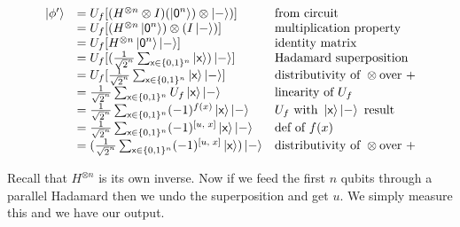 \[ 
\begin{array}{lll}
 \left|\phi'\right\rangle &= U_f [(H^{\otimes n} \otimes I)(\left|\textsf{0}^n\right\rangle) \otimes \left|-\right\rangle)]  & \text{from circuit} \\
  &= U_f [(H^{\otimes n}\left|\textsf{0}^n\right\rangle) \otimes (I\left|-\right\rangle)]  & \text{multiplication property} \\
  &= U_f [H^{\otimes n}\left|\textsf{0}^n\right\rangle\left|-\right\rangle]  & \text{identity matrix} \\
  &= U_f [(\frac{1}{\sqrt{2}^n} \sum_{\textsf{x} \in \{0,1\}^n} \left|\textsf{x}\right\rangle) \left|-\right\rangle] & \text{Hadamard superposition} \\
  &= U_f [\frac{1}{\sqrt{2}^n} \sum_{\textsf{x} \in \{0,1\}^n} \left|\textsf{x}\right\rangle \left|-\right\rangle]  
  & \text{distributivity of } \otimes  \text{over } + \\  
  &= \frac{1}{\sqrt{2}^n} \sum_{\textsf{x} \in \{0,1\}^n} U_f \left|\textsf{x}\right\rangle \left|-\right\rangle  & \text{linearity of } U_f \\
  &= \frac{1}{\sqrt{2}^n} \sum_{\textsf{x} \in \{0,1\}^n} (-1)^{f(x)} \left|\textsf{x}\right\rangle \left|-\right\rangle  
  & U_f \text{ with } \left|\textsf{x}\right\rangle\left|-\right\rangle \text{ result} \\
  &= \frac{1}{\sqrt{2}^n} \sum_{\textsf{x} \in \{0,1\}^n} (-1)^{[u,\;x]} \left|\textsf{x}\right\rangle \left|-\right\rangle  
  & \text{def of } f(x)  \\
  &= (\frac{1}{\sqrt{2}^n} \sum_{\textsf{x} \in \{0,1\}^n} (-1)^{[u,\;x]} \left|\textsf{x}\right\rangle) \left|-\right\rangle  
  & \text{distributivity of } \otimes  \text{over } +   
\end{array}
\] 

Recall that $H^{\otimes n}$ is its own inverse. 
Now if we feed the first $n$ qubits through a parallel Hadamard 
then we undo the superposition and get $u$. We simply measure this and we have our output.


